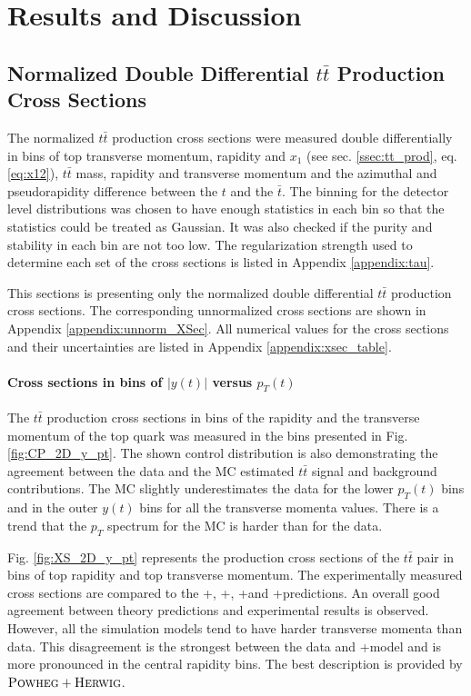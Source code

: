 \chapter{Results and Discussion}\label{chapt:results}

\section{Normalized Double Differential $t\bar{t}$ Production Cross Sections}\label{ssec:xsec_mes}

The normalized $t\bar{t}$ production cross sections were measured double differentially in bins of top transverse momentum, rapidity and  $x_{1}$
(see sec. \ref{ssec:tt_prod}, eq. \ref{eq:x12}),
$t\bar{t}$ mass, rapidity and transverse momentum and the azimuthal and pseudorapidity difference between the $t$ and the $\bar{t}$.
The binning for the detector level distributions was chosen to have enough statistics in each bin so that the statistics could be treated as Gaussian.
It was also checked if the purity and stability in each bin are not too low.
The regularization strength used to determine each set of the cross sections is listed in Appendix \ref{appendix:tau}.

This sections is presenting only the normalized double differential $t\bar{t}$ production cross sections. The corresponding
unnormalized cross sections are shown in Appendix \ref{appendix:unnorm_XSec}. All numerical values for the cross sections
and their uncertainties are listed in Appendix \ref{appendix:xsec_table}.

\subsubsection{Cross sections in bins of $|y(t)|$ versus $p_{T}(t)$}

The $t\bar{t}$ production cross sections in bins of the rapidity and the transverse momentum of the top quark was
measured in the bins presented in Fig. \ref{fig:CP_2D_y_pt}. The shown control distribution is also demonstrating the agreement between 
the data and the MC estimated $t\bar{t}$ signal and background contributions. The MC slightly underestimates the data for 
the lower $p_{T}(t)$ bins and in the outer $y(t)$ bins for all the transverse momenta values. There is a trend that the $p_{T}$
spectrum for the MC is harder than for the data.

Fig. \ref{fig:XS_2D_y_pt} represents the production cross sections of the $t\bar{t}$ pair in bins of top rapidity and top transverse momentum.
The experimentally measured cross sections are compared to the \MG+\PYTHIA, \Powheg+\PYTHIA, \Powheg+\HERWIG and \MCNLO+\HERWIG predictions.
An overall good agreement between theory predictions and experimental results is observed. However, all the simulation models tend to have 
harder transverse momenta than data. This disagreement is the strongest between the data and \MG+\PYTHIA model and is more pronounced in the 
central rapidity bins. The best description is provided by $\textsc{Powheg}+\textsc{Herwig}$.

